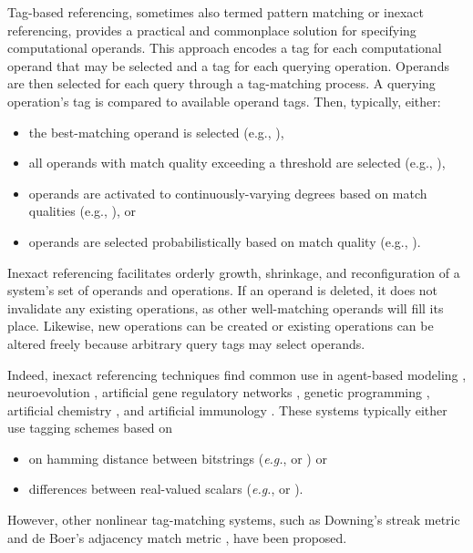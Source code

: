 Tag-based referencing, sometimes also termed pattern matching or inexact referencing, provides a practical and commonplace solution for specifying computational operands.
This approach encodes a tag for each computational operand that may be selected and a tag for each querying operation.
Operands are then selected for each query through a tag-matching process.
A querying operation's tag is compared to available operand tags.
Then, typically, either:
\begin{itemize}
  \item the best-matching operand is selected (e.g., \citep{spector2012tag}),
  \item all operands with match quality exceeding a threshold are selected (e.g., \citep{riolo2001evolution}),
  \item operands are activated to continuously-varying degrees based on match qualities (e.g., \citep{banzhaf2003artificial}), or
  \item operands are selected probabilistically based on match quality (e.g., \citep{seiden1992simulation}).
\end{itemize}

Inexact referencing facilitates orderly growth, shrinkage, and reconfiguration of a system's set of operands and operations.
If an operand is deleted, it does not invalidate any existing operations, as other well-matching operands will fill its place.
Likewise, new operations can be created or existing operations can be altered freely because arbitrary query tags may select operands. 

Indeed, inexact referencing techniques find common use in agent-based modeling \citep{riolo2001evolution}, neuroevolution \citep{reisinger2007acquiring}, artificial gene regulatory networks \citep{banzhaf2003artificial}, genetic programming \citep{spector2011tag, lalejini2018evolving}, artificial chemistry \citep{dittrich2001artificial}, and artificial immunology \citep{timmis2008theoretical}.
These systems typically either use tagging schemes based on
\begin{itemize}
    \item on hamming distance between bitstrings (\textit{e.g.}, \cite{lalejini2018evolving} or \cite{banzhaf2003artificial}) or 
    \item differences between real-valued scalars (\textit{e.g.}, \cite{riolo2001evolution} or \cite{spector2011tag}).
\end{itemize}    
However, other nonlinear tag-matching systems, such as Downing's streak metric \citep{downing2015intelligence} and de Boer's adjacency match metric \citep{DEBOER1991381}, have been proposed.

